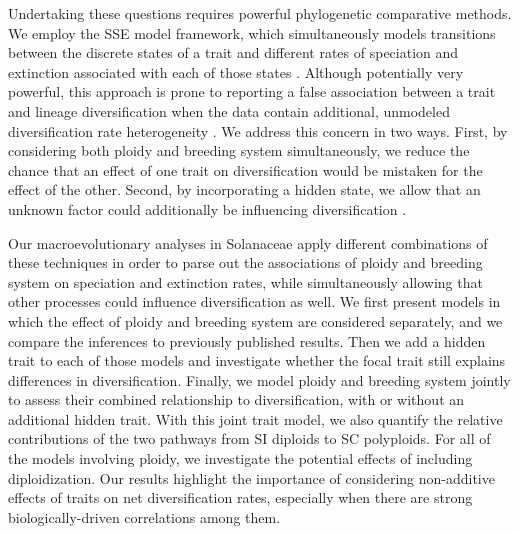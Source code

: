 Undertaking these questions requires powerful phylogenetic comparative methods.
We employ the SSE model framework, which simultaneously models transitions between the discrete states of a trait and different rates of speciation and extinction associated with each of those states \citep{maddison_2007, fitzjohn_2012}.
Although potentially very powerful, this approach is prone to reporting a false association between a trait and lineage diversification when the data contain additional, unmodeled diversification rate heterogeneity \citep{maddison_2015, rabosky_2015}.
We address this concern in two ways.
First, by considering both ploidy and breeding system simultaneously, we reduce the chance that an effect of one trait on diversification would be mistaken for the effect of the other.
Second, by incorporating a hidden state, we allow that an unknown factor could additionally be influencing diversification \citep{beaulieu_2016}.

Our macroevolutionary analyses in Solanaceae apply different combinations of these techniques in order to parse out the associations of ploidy and breeding system on speciation and extinction rates, while simultaneously allowing that other processes could influence diversification as well.
We first present models in which the effect of ploidy and breeding system are considered separately, and we compare the inferences to previously published results. 
Then we add a hidden trait to each of those models and investigate whether the focal trait still explains differences in diversification.
Finally, we model ploidy and breeding system jointly to assess their combined relationship to diversification, with or without an additional hidden trait.
With this joint trait model, we also quantify the relative contributions of the two pathways from SI diploids to SC polyploids.
For all of the models involving ploidy, we investigate the potential effects of including diploidization.
Our results highlight the importance of considering non-additive effects of traits on net diversification rates, especially when there are strong biologically-driven correlations among them.
